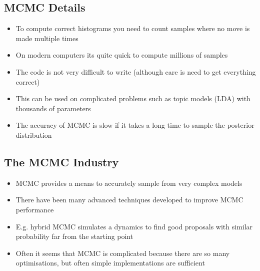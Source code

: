 \begin{slide}
\section{MCMC Details}

\begin{PauseHighLight}
  \begin{itemize}
  \item To compute correct histograms you need to count samples where no
    move is made multiple times\pause
  \item On modern computers its quite quick to compute millions of
    samples\pause
  \item The code is not very difficult to write (although care is need
    to get everything correct)\pause
  \item This can be used on complicated problems such as topic models
    (LDA) with thousands of parameters\pause
  \item The accuracy of MCMC is slow if it takes a long time to sample
    the posterior distribution\pause
  \end{itemize}
\end{PauseHighLight}

\end{slide}



\begin{slide}
\section{The MCMC Industry}

\begin{PauseHighLight}
  \begin{itemize}
  \item MCMC provides a means to accurately sample from very complex
    models\pause
  \item There have been many advanced techniques developed to improve
    MCMC performance\pause
  \item E.g. hybrid MCMC simulates a dynamics to find good proposals
    with similar probability far from the starting point\pause
  \item Often it seems that MCMC is complicated because there are so
    many optimisations, but often simple implementations are
    sufficient\pause
  \end{itemize}
\end{PauseHighLight}

\end{slide}

